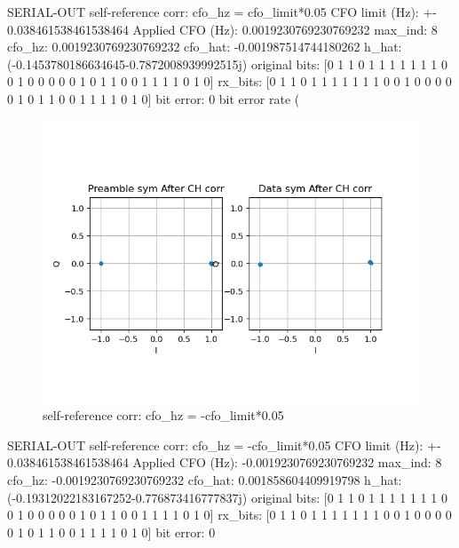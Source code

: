 \documentclass[
	letterpaper, %
	10pt, %
]{CSUniSchoolLabReport}
\begin{document}
SERIAL-OUT self-reference corr: cfo\_hz = cfo\_limit*0.05\newline
CFO limit (Hz): +-  0.038461538461538464\newline
Applied CFO (Hz):  0.0019230769230769232\newline
max\_ind:  8\newline
cfo\_hz:  0.0019230769230769232\newline
cfo\_hat:  -0.001987514744180262\newline
h\_hat: (-0.1453780186634645-0.7872008939992515j)\newline
original bits:  [0 1 1 0 1 1 1 1 1 1 1 0 0 1 0 0 0 0 0 1 0 1 1 0 0 1 1 1 1 0 1 0]\newline
rx\_bits:  [0 1 1 0 1 1 1 1 1 1 1 0 0 1 0 0 0 0 0 1 0 1 1 0 0 1 1 1 1 0 1 0]\newline
bit error:  0\newline
bit error rate (%

\begin{figure}[H] %
	\centering %
	\includegraphics[width=1.2\textwidth]{assignment2b.png} %
	\caption{self-reference corr: cfo\_hz = -cfo\_limit*0.05}
	\label{fig:block}
\end{figure}

SERIAL-OUT self-reference corr: cfo\_hz = -cfo\_limit*0.05\newline
CFO limit (Hz): +-  0.038461538461538464\newline
Applied CFO (Hz):  -0.0019230769230769232\newline
max\_ind:  8\newline
cfo\_hz:  -0.0019230769230769232\newline
cfo\_hat:  0.001858604409919798\newline
h\_hat: (-0.19312022183167252-0.776873416777837j)\newline
original bits:  [0 1 1 0 1 1 1 1 1 1 1 0 0 1 0 0 0 0 0 1 0 1 1 0 0 1 1 1 1 0 1 0]\newline
rx\_bits:  [0 1 1 0 1 1 1 1 1 1 1 0 0 1 0 0 0 0 0 1 0 1 1 0 0 1 1 1 1 0 1 0]\newline
bit error:  0\newline
\end{document}
